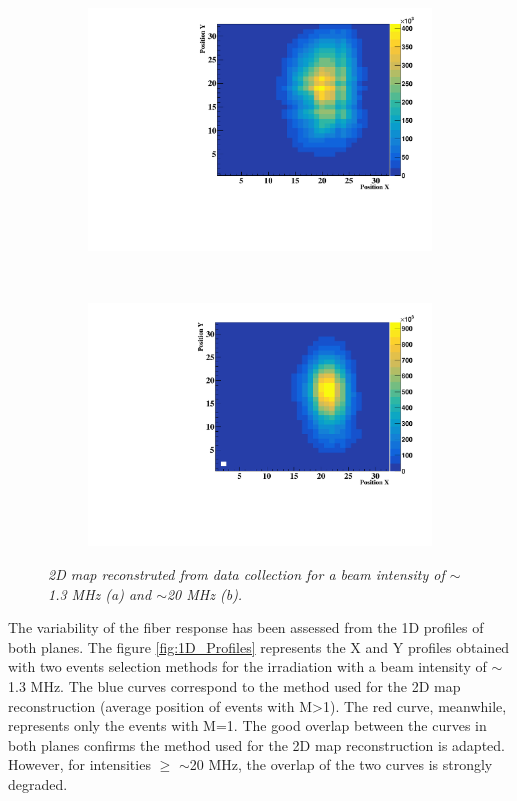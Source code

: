 \documentclass[a4paper,11pt]{article}
\begin{document}
\begin{figure}[H]
\centering
    \begin{subfigure}{0.45\textwidth} \centering \includegraphics[width=\textwidth]{figures/2D_Map_1MHz.pdf} \caption{} \label{fig:2D_1MHz}
    \end{subfigure}
    ~
    \begin{subfigure}{0.45\textwidth} \centering \includegraphics[width=\textwidth]{figures/2D_Map_20MHz.pdf} \caption{} \label{fig:2D_20MHz}
    \end{subfigure}
\caption{\small{\textit{2D map reconstruted from data collection for a beam intensity of $\sim$1.3 MHz (a) and $\sim$20 MHz (b).}}}
\label{fig:2D_Maps}
\end{figure}
The variability of the fiber response has been assessed from the 1D profiles of both planes. The figure \ref{fig:1D_Profiles} represents the X and Y profiles obtained with two events selection methods for the irradiation with a beam intensity of $\sim$1.3 MHz. The blue curves correspond to the method used  for the 2D map reconstruction (average position of events with M>1). The red curve, meanwhile, represents only the events with M=1. The good overlap between the curves in both planes confirms the method used for the 2D map reconstruction is adapted. However, for intensities $\geq$ $\sim$20 MHz, the overlap of the two curves is strongly degraded.\\
\end{document}
